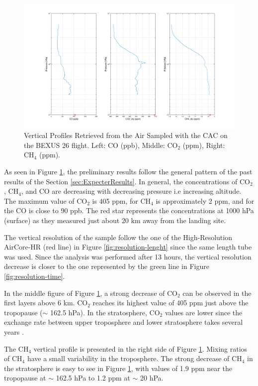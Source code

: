 \begin{figure}[H]
    \centering
    \includegraphics[width=\linewidth]{7-data-analysis-and-results/img/Finalprofilesmast.png}
    \caption{Vertical Profiles Retrieved from the Air Sampled with the CAC on the BEXUS 26 flight. Left: CO (ppb), Middle: CO$_2$ (ppm), Right: CH$_4$ (ppm).}
    \label{fig:verticalprofiles}
\end{figure}

As seen in Figure \ref{fig:verticalprofiles}, the preliminary results follow the general pattern of the past results of the Section \ref{sec:ExpecterResults}. In general, the concentrations of CO$_2$, CH$_4$, and CO are decreasing with decreasing pressure i.e increasing altitude. The maximum value of CO$_2$ is 405 ppm, for CH$_4$ is approximately 2 ppm, and for the CO is close to 90 ppb. The red star represents the concentrations at 1000 hPa (surface) as they measured just about 20 km away from the landing site.

The vertical resolution of the sample follow the one of the High-Resolution AirCore-HR (red line) in Figure \ref{fig:resolution-lenght} since the same length tube was used. Since the analysis was performed after 13 hours, the vertical resolution decrease is closer to the one represented by the green line in Figure \ref{fig:resolution-time}.

In the middle figure of Figure \ref{fig:verticalprofiles}, a strong decrease of CO$_2$ can be observed in the first layers above 6 km. CO$_2$ reaches its highest value of 405 ppm just above the tropopause ($\sim$ 162.5 hPa). In the stratosphere, CO$_2$ values are lower since the exchange rate between upper troposphere and lower stratosphere takes several years \cite{Membrive}. 

The CH$_4$ vertical profile is presented in the right side of Figure \ref{fig:verticalprofiles}. Mixing ratios of CH$_4$ have a small variability in the troposphere. The strong decrease of CH$_4$ in the
stratosphere is easy to see in Figure \ref{fig:verticalprofiles}, with values of  1.9 ppm near the tropopause at $\sim$ 162.5 hPa to 1.2 ppm at
$\sim$ 20 hPa. 

